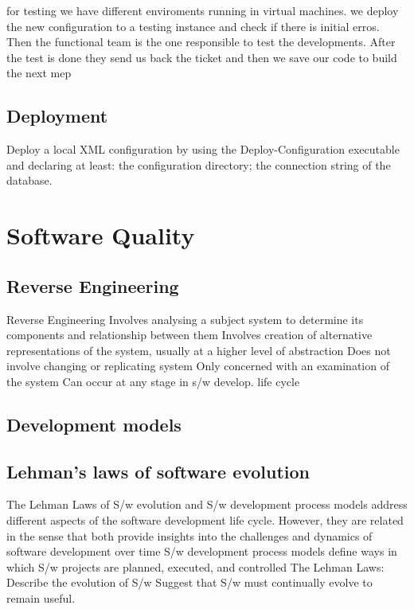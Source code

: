 for testing we have different enviroments running in virtual machines. we deploy the new configuration to a testing instance and check if there is initial erros. Then the functional team is the one responsible to test the developments. After the test is done they send us back the ticket and then we save our code to build the next mep

\subsection{Deployment}
\label{sec:Template}

Deploy a local XML configuration by using the Deploy-Configuration executable and declaring at least: the configuration directory; the connection string of the database.

\section{Software Quality}
\label{sec:Template}

\subsection{Reverse Engineering}
\label{sec:Development models}

Reverse Engineering Involves analysing a subject system to determine its components and relationship between them Involves creation of alternative representations of the system, usually at a higher level of abstraction Does not involve changing or replicating system Only concerned with an examination of the system Can occur at any stage in s/w develop. life cycle

\subsection{Development models}
\label{sec:Development models}

\subsection{Lehman’s laws of software evolution}
\label{sec:Lehman}

The Lehman Laws of S/w evolution and S/w development process models address different aspects of the software development life cycle. However, they are related in the sense that both provide insights into the challenges and dynamics of software development over time S/w development process models define ways in which S/w projects are planned, executed, and controlled The Lehman Laws: Describe the evolution of S/w Suggest that S/w must continually evolve to remain useful.

